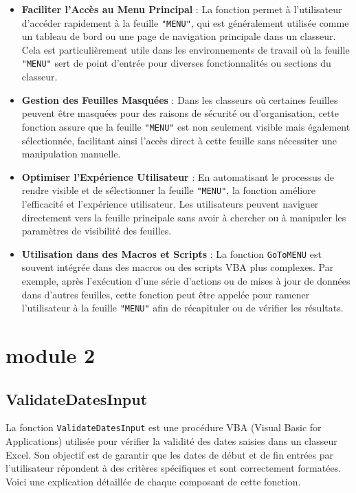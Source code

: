 \documentclass[a4paper, oneside, 12pt, final]{extreport}
\begin{document}
\begin{itemize}
    \item \textbf{Faciliter l'Accès au Menu Principal} : La fonction permet à l'utilisateur d'accéder rapidement à la feuille \texttt{"MENU"}, qui est généralement utilisée comme un tableau de bord ou une page de navigation principale dans un classeur. Cela est particulièrement utile dans les environnements de travail où la feuille \texttt{"MENU"} sert de point d'entrée pour diverses fonctionnalités ou sections du classeur.
    \item \textbf{Gestion des Feuilles Masquées} : Dans les classeurs où certaines feuilles peuvent être masquées pour des raisons de sécurité ou d'organisation, cette fonction assure que la feuille \texttt{"MENU"} est non seulement visible mais également sélectionnée, facilitant ainsi l'accès direct à cette feuille sans nécessiter une manipulation manuelle.
    \item \textbf{Optimiser l'Expérience Utilisateur} : En automatisant le processus de rendre visible et de sélectionner la feuille \texttt{"MENU"}, la fonction améliore l'efficacité et l'expérience utilisateur. Les utilisateurs peuvent naviguer directement vers la feuille principale sans avoir à chercher ou à manipuler les paramètres de visibilité des feuilles.
    \item \textbf{Utilisation dans des Macros et Scripts} : La fonction \texttt{GoToMENU} est souvent intégrée dans des macros ou des scripts VBA plus complexes. Par exemple, après l'exécution d'une série d'actions ou de mises à jour de données dans d'autres feuilles, cette fonction peut être appelée pour ramener l'utilisateur à la feuille \texttt{"MENU"} afin de récapituler ou de vérifier les résultats.
\end{itemize}
\section{module 2}
\subsection{ValidateDatesInput}

La fonction \texttt{ValidateDatesInput} est une procédure VBA (Visual Basic for Applications) utilisée pour vérifier la validité des dates saisies dans un classeur Excel. Son objectif est de garantir que les dates de début et de fin entrées par l'utilisateur répondent à des critères spécifiques et sont correctement formatées. Voici une explication détaillée de chaque composant de cette fonction.
\end{document}
